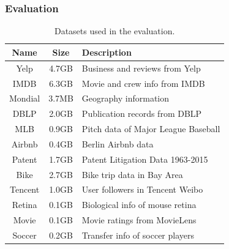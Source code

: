 \documentclass[]{article}
\begin{document}
            \subsubsection{Evaluation}

                \begin{table}
                    \centering
                    \small
                    \begin{tabular}{|c|c|l|}
                    \hline
                    \textbf{Name} & \textbf{Size} & \textbf{Description} \\
                    \hline
                    Yelp & 4.7GB & Business and reviews from Yelp \\
                    \hline
                    IMDB & 6.3GB & Movie and crew info from IMDB \\
                    \hline
                    Mondial & 3.7MB & Geography information \\
                    \hline
                    DBLP & 2.0GB & Publication records from DBLP \\
                    \hline
                    MLB & 0.9GB & Pitch data of Major League Baseball \\
                    \hline
                    Airbnb & 0.4GB & Berlin Airbnb data \\
                    \hline
                    Patent & 1.7GB & Patent Litigation Data 1963-2015 \\
                    \hline
                    Bike & 2.7GB & Bike trip data in Bay Area \\
                    \hline
                    Tencent & 1.0GB & User followers in Tencent Weibo \\
                    \hline
                    Retina & 0.1GB & Biological info of mouse retina \\
                    \hline
                    Movie & 0.1GB & Movie ratings from MovieLens \\
                    \hline
                    Soccer & 0.2GB & Transfer info of soccer players \\
                    \hline
                    \end{tabular}
                    \vspace{5pt}
                    \caption{Datasets used in the evaluation.}
                    \label{tab:datasets}
                    \vspace{-15pt}
                \end{table}
\end{document}
